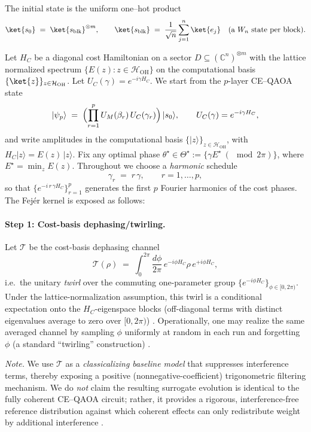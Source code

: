 \documentclass[a4paper,unpublished,onecolumn,11pt]{quantumarticle}
\theoremstyle{definition}
\theoremstyle{remark}
\newcommand{\OH}{\mathcal{H}_{\mathrm{OH}}}
\begin{document}
      The initial state is the
      uniform one–hot product
      \[
      \ket{s_0}\;=\;\ket{s_{\mathrm{blk}}}^{\otimes m},
      \qquad
      \ket{s_{\mathrm{blk}}}\;=\;\frac{1}{\sqrt n}\sum_{j=1}^n \ket{e_j}
      \quad\text{(a $W_n$ state per block)}.
      \]


Let \(H_C\) be a diagonal cost Hamiltonian on a sector \(D\subseteq (\mathbb C^n)^{\otimes m}\)
with the lattice normalized spectrum \(\{E(z): z\in\OH\}\) on the computational basis \(\{\ket{z}\}_{z\in\OH}\).
Let \(U_C(\gamma)=e^{-i\gamma H_C}\). We start from the \(p\)-layer CE--QAOA state
\begin{equation}
  \label{eq:state-def-again}
  |\psi_p\rangle
  \;=\;
  \Bigl(\prod_{r=1}^{p} U_M(\beta_r)\,U_C(\gamma_r)\Bigr)\,|s_0\rangle,
  \qquad
  U_C(\gamma)=e^{-i\gamma H_C},
\end{equation}
and write amplitudes in the computational basis \(\{|z\rangle\}_{z\in\OH}\), with
\(H_C|z\rangle = E(z)\,|z\rangle\).
Fix any optimal phase \(\theta^\star \in \Theta^\star := \{\gamma E^\star \ (\!\!\!\!\!\!\mod 2\pi)\}\),
where \(E^\star=\min_z E(z)\). Throughout we choose a \emph{harmonic} schedule
\begin{equation}
  \label{eq:harmonic-sched}
  \gamma_r \;=\; r\,\gamma,\qquad r=1,\dots,p,
\end{equation}
so that \(\{e^{-i\,r\,\gamma H_C}\}_{r=1}^p\) generates the first \(p\) Fourier harmonics of the cost phases.  The Fej\'er kernel is exposed as follows:
\paragraph{Step 1: Cost-basis dephasing/twirling.}


Let \(\mathcal T\) be the cost-basis dephasing channel
\[
  \mathcal T(\rho)
  \;=\;\int_{0}^{2\pi}\!\frac{d\phi}{2\pi}\,e^{-i\phi H_C}\rho\,e^{+i\phi H_C},
\]
i.e.\ the unitary \emph{twirl} over the commuting one-parameter group
\(\{e^{-i\phi H_C}\}_{\phi\in[0,2\pi)}\). 
Under the lattice-normalization assumption, this twirl is a conditional expectation onto the
$H_C$-eigenspace blocks (off-diagonal terms with distinct eigenvalues average to zero over $[0,2\pi)$) \cite{Watrous2018}. Operationally, one may realize
the same averaged channel by sampling \(\phi\) uniformly at random in each run and
forgetting \(\phi\) (a standard “twirling” construction) \cite{BennettEtAl1996Purification}.

\medskip
\noindent\emph{Note.} We use \(\mathcal T\) as a \emph{classicalizing baseline model}
that suppresses interference terms, thereby exposing a positive (nonnegative-coefficient)
trigonometric filtering mechanism. We do \emph{not} claim the resulting surrogate evolution
is identical to the fully coherent CE--QAOA circuit; rather, it provides a rigorous,
interference-free reference distribution against which coherent effects can only
redistribute weight by additional interference \cite{Watrous2018}.
\end{document}
